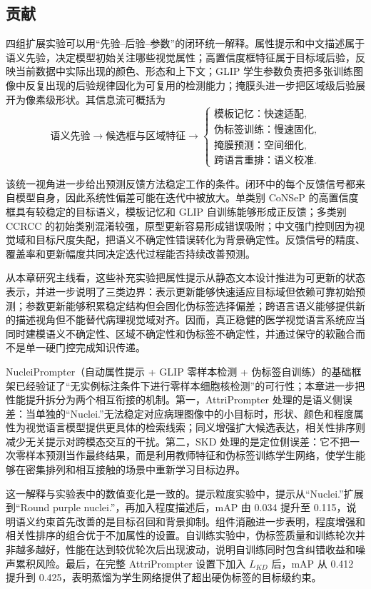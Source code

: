 \subsection{贡献}
四组扩展实验可以用“先验--后验--参数”的闭环统一解释。属性提示和中文描述属于语义先验，决定模型初始关注哪些视觉属性；高置信度框特征属于目标域后验，反映当前数据中实际出现的颜色、形态和上下文；GLIP 学生参数负责把多张训练图像中反复出现的后验规律固化为可复用的检测能力；掩膜头进一步把区域级后验展开为像素级形状。其信息流可概括为
\begin{equation}
\text{语义先验}
\rightarrow
\text{候选框与区域特征}
\rightarrow
\begin{cases}
\text{模板记忆：快速适配},\\
\text{伪标签训练：慢速固化},\\
\text{掩膜预测：空间细化},\\
\text{跨语言重排：语义校准}.
\end{cases}
\end{equation}

该统一视角进一步给出预测反馈方法稳定工作的条件。闭环中的每个反馈信号都来自模型自身，因此系统性偏差可能在迭代中被放大。单类别 CoNSeP 的高置信度框具有较稳定的目标语义，模板记忆和 GLIP 自训练能够形成正反馈；多类别 CCRCC 的初始类别混淆较强，原型更新容易形成错误吸附；中文强门控则因为视觉域和目标尺度失配，把语义不确定性错误转化为背景确定性。反馈信号的精度、覆盖率和更新幅度共同决定迭代过程能否持续改善预测。

从本章研究主线看，这些补充实验把属性提示从静态文本设计推进为可更新的状态表示，并进一步说明了三类边界：表示更新能够快速适应目标域但依赖可靠初始预测；参数更新能够积累稳定结构但会固化伪标签选择偏差；跨语言语义能够提供新的描述视角但不能替代病理视觉域对齐。因而，真正稳健的医学视觉语言系统应当同时建模语义不确定性、区域不确定性和伪标签不确定性，并通过保守的软融合而不是单一硬门控完成知识传递。

NucleiPrompter（自动属性提示 + GLIP 零样本检测 + 伪标签自训练）的基础框架已经验证了“无实例标注条件下进行零样本细胞核检测”的可行性；本章进一步把性能提升拆分为两个相互衔接的机制。第一，AttriPrompter 处理的是语义侧误差：当单独的“Nuclei.”无法稳定对应病理图像中的小目标时，形状、颜色和程度属性为视觉语言模型提供更具体的检索线索；同义增强扩大候选表达，相关性排序则减少无关提示对跨模态交互的干扰。第二，SKD 处理的是定位侧误差：它不把一次零样本预测当作最终结果，而是利用教师特征和伪标签训练学生网络，使学生能够在密集排列和相互接触的场景中重新学习目标边界。

这一解释与实验表中的数值变化是一致的。提示粒度实验中，提示从“Nuclei.”扩展到“Round purple nuclei.”，再加入程度描述后，mAP 由 0.034 提升至 0.115，说明语义约束首先改善的是目标召回和背景抑制。组件消融进一步表明，程度增强和相关性排序的组合优于不加属性的设置。自训练实验中，伪标签质量和训练轮次并非越多越好，性能在达到较优轮次后出现波动，说明自训练同时包含纠错收益和噪声累积风险。最后，在完整 AttriPrompter 设置下加入 $L_{KD}$ 后，mAP 从 0.412 提升到 0.425，表明蒸馏为学生网络提供了超出硬伪标签的目标级约束。

